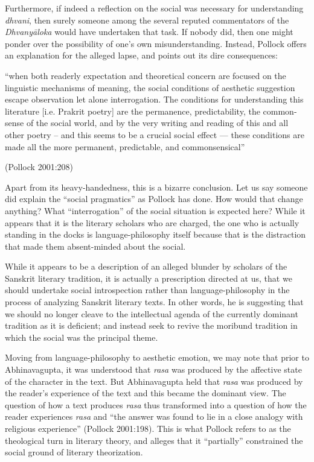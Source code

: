 Furthermore, if indeed a reflection on the social was necessary for understanding \textsl{dhvani}, then surely someone among the several reputed commentators of the \textsl{Dhvanyāloka} would have undertaken that task. If nobody did, then one might ponder over the possibility of one's own misunderstanding. Instead, Pollock offers an explanation for the alleged lapse, and points out its dire consequences: 

\begin{myquote}
``when both readerly expectation and theoretical concern are focused on the linguistic mechanisms of meaning, the social conditions of aesthetic suggestion escape observation let alone interrogation. The conditions for understanding this literature [i.e. Prakrit poetry] are the permanence, predictability, the common-sense of the social world, and by the very writing and reading of this and all other poetry – and this seems to be a crucial social effect --- these conditions are made all the more permanent, predictable, and commonsensical''

\hfill (Pollock 2001:208)
\end{myquote}

Apart from its heavy-handedness, this is a bizarre conclusion. Let us say someone did explain the ``social pragmatics'' as Pollock has done. How would that change anything? What ``interrogation'' of the social situation is expected here? While it appears that it is the literary scholars who are charged, the one who is actually standing in the docks is language-philosophy itself because that is the distraction that made them absent-minded about the social. 

While it appears to be a description of an alleged blunder by scholars of the Sanskrit literary tradition, it is actually a prescription directed at us, that we should undertake social introspection rather than language-philosophy in the process of analyzing Sanskrit literary texts. In other words, he is suggesting that we should no longer cleave to the intellectual agenda of the currently dominant tradition as it is deficient; and instead seek to revive the moribund tradition in which the social was the principal theme.

Moving from language-philosophy to aesthetic emotion, we may note that prior to Abhinavagupta, it was understood that \textsl{rasa} was produced by the affective state of the character in the text. But Abhinavagupta held that \textsl{rasa} was produced by the reader's experience of the text and this became the dominant view. The question of how a text produces \textsl{rasa} thus transformed into a question of how the reader experiences \textsl{rasa} and ``the answer was found to lie in a close analogy with religious experience'' (Pollock 2001:198). This is what Pollock refers to as the theological turn in literary theory, and alleges that it ``partially'' constrained the social ground of literary theorization.

